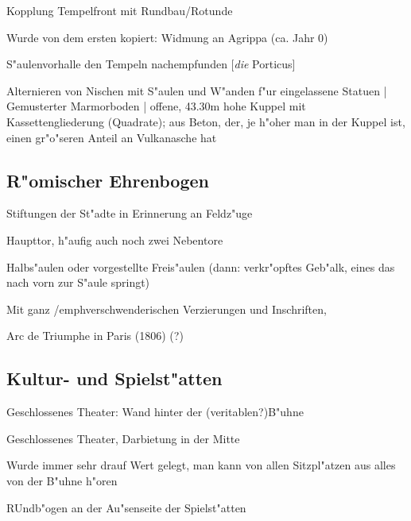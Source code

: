 \documentclass[emulatestandardclasses]{scrartcl}
\begin{document}
\begin{description}[leftmargin=!,labelwidth=\widthof{\bfseries Hintergrund}]
  \item[Hintergrund] Kopplung Tempelfront mit Rundbau/Rotunde 
  \item[Inschrift] Wurde von dem ersten kopiert: Widmung an Agrippa (ca. Jahr 0)
  \item[Porticus]  S"aulenvorhalle den Tempeln nachempfunden [\emph{die} Porticus]
  \item[Rotunde] Alternieren von Nischen mit S"aulen und W"anden f"ur eingelassene Statuen | Gemusterter Marmorboden | offene, 43.30m hohe Kuppel mit Kassettengliederung (Quadrate); aus Beton, der, je h"oher man in der Kuppel ist, einen gr"o"seren Anteil an Vulkanasche hat 
\end{description}

\subsection{R"omischer Ehrenbogen}

\begin{description}[leftmargin=!,labelwidth=\widthof{\bfseries Nachempfindung}]
  \item[Hintergrund] Stiftungen der St"adte in Erinnerung an Feldz"uge 
  \item[Tore] Haupttor, h"aufig auch noch zwei Nebentore
  \item[Gliederung] Halbs"aulen oder vorgestellte Freis"aulen (dann: verkr"opftes Geb"alk, eines das nach vorn zur S"aule springt)
  \item[Attica] Mit ganz /emph{verschwenderischen} Verzierungen und Inschriften,
  \item[Nachempfindung] Arc de Triumphe in Paris (1806) (?)
\end{description}

\subsection{Kultur- und Spielst"atten}

\begin{description}[leftmargin=!,labelwidth=\widthof{\bfseries Tabulariumsmotiv}]
  \item[Theater] Geschlossenes Theater: Wand hinter der (veritablen?)B"uhne
  \item[Amphitheater] Geschlossenes Theater, Darbietung in der Mitte 
  \item[Akustik] Wurde immer sehr drauf Wert gelegt, man kann von allen Sitzpl"atzen aus alles von der B"uhne h"oren
  \item[Tabulariumsmotiv] RUndb"ogen an der Au"senseite der Spielst"atten
\end{description}
\end{document}
